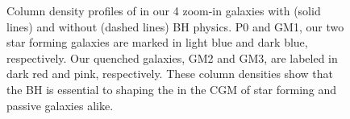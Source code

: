 \documentclass[]{emulateapj}
\begin{document}
\begin{figure}[ht!]
\centerline{}
\caption[]{Column density profiles of  in our 4 zoom-in galaxies with (solid lines) and without (dashed lines) BH physics. P0 and GM1, our two star forming galaxies are marked in light blue and dark blue, respectively. Our quenched galaxies, GM2 and GM3, are labeled in dark red and pink, respectively. These column densities show that the BH is essential to shaping the  in the CGM of star forming and passive galaxies alike.}
\label{fig-GMs_NOvi}
\end{figure}
\end{document}

